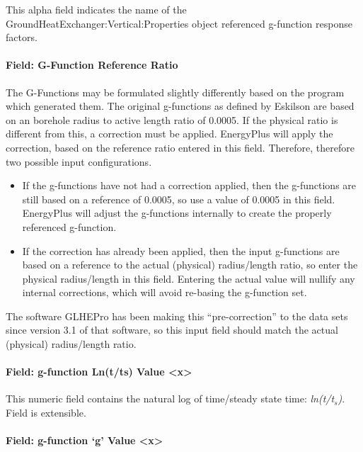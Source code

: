 This alpha field indicates the name of the GroundHeatExchanger:Vertical:Properties object referenced g-function response factors.

\paragraph{Field: G-Function Reference Ratio}\label{field-g-function-reference-ratio}

The G-Functions may be formulated slightly differently based on the program which generated them. The original g-functions as defined by Eskilson are based on an borehole radius to active length ratio of 0.0005. If the physical ratio is different from this, a correction must be applied. EnergyPlus will apply the correction, based on the reference ratio entered in this field. Therefore, therefore two possible input configurations.

\begin{itemize}
\item
  If the g-functions have not had a correction applied, then the g-functions are still based on a reference of 0.0005, so use a value of 0.0005 in this field. EnergyPlus will adjust the g-functions internally to create the properly referenced g-function.
\item
  If the correction has already been applied, then the input g-functions are based on a reference to the actual (physical) radius/length ratio, so enter the physical radius/length in this field. Entering the actual value will nullify any internal corrections, which will avoid re-basing the g-function set.
\end{itemize}

The software GLHEPro has been making this ``pre-correction'' to the data sets since version 3.1 of that software, so this input field should match the actual (physical) radius/length ratio.

\paragraph{Field: g-function Ln(t/ts) Value \textless{}x\textgreater{}}\label{field-g-function-lntts-value-x}

This numeric field contains the natural log of time/steady state time: \emph{ln(t/t\(_{s}\))}. Field is extensible.

\paragraph{Field: g-function `g' Value \textless{}x\textgreater{}}\label{field-g-function-g-value-x}

